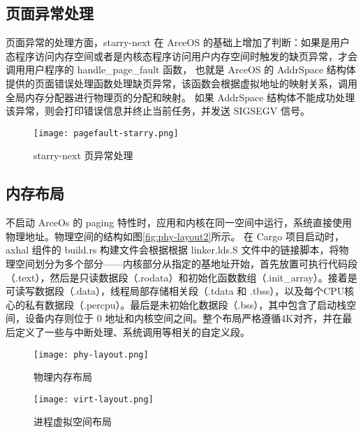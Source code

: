 \subsection{页面异常处理}
页面异常的处理方面，starry-next 在 ArceOS 的基础上增加了判断：如果是用户态程序访问内存空间或者是内核态程序访问用户内存空间时触发的缺页异常，才会调用用户程序的 handle\_page\_fault 函数，
也就是 ArceOS 的 AddrSpace 结构体提供的页面错误处理函数处理缺页异常，该函数会根据虚拟地址的映射关系，调用全局内存分配器进行物理页的分配和映射。
如果 AddrSpace 结构体不能成功处理该异常，则会打印错误信息并终止当前任务，并发送 SIGSEGV 信号。

\begin{figure}[H]
    \centering
    \texttt{[image: pagefault-starry.png]}
    \caption{starry-next 页异常处理}
    \label{fig:pagefault-starry}
\end{figure}

\subsection{内存布局}

不启动 ArceOs 的 paging 特性时，应用和内核在同一空间中运行，系统直接使用物理地址。物理空间的结构如图\ref{fig:phy-layout2}所示。
在 Cargo 项目启动时，axhal 组件的 build.rs 构建文件会根据根据 linker.lds.S 文件中的链接脚本，将物理空间划分为多个部分——内核部分从指定的基地址开始，首先放置可执行代码段（.text），然后是只读数据段（.rodata）和初始化函数数组（.init\_array）。接着是可读写数据段（.data），线程局部存储相关段（.tdata 和 .tbss），以及每个CPU核心的私有数据段（.percpu）。最后是未初始化数据段（.bss），其中包含了启动栈空间，设备内存则位于 0 地址和内核空间之间。整个布局严格遵循4K对齐，并在最后定义了一些与中断处理、系统调用等相关的自定义段。

\begin{figure}[H]
\centering %
\begin{minipage}[b]{0.45\textwidth} %
\centering %
\texttt{[image: phy-layout.png]} %
\caption{物理内存布局}
\label{fig:phy-layout2}
\end{minipage}
\begin{minipage}[b]{0.45\textwidth} %
\centering %
\texttt{[image: virt-layout.png]}%
\caption{进程虚拟空间布局}
\label{fig:virt-layout2}
\end{minipage}
\end{figure}


